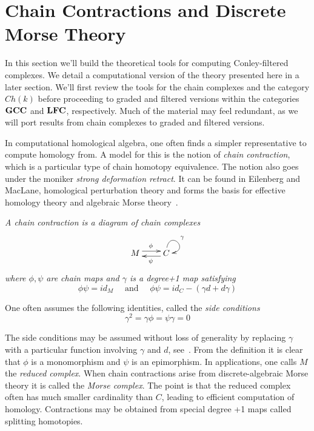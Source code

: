 

\section{Chain Contractions and Discrete Morse Theory}\label{sec:contractions}

In this section we'll build the theoretical tools for computing Conley-filtered complexes.   We detail a computational version of the theory presented here in a later section.  We'll first review the tools for the chain complexes and the category $Ch(k)$ before proceeding to graded and filtered versions within the categories ${\bf GCC}$ and ${\bf LFC}$, respectively.  Much of the material may feel redundant, as we will port results from chain complexes to graded and filtered versions.


  In computational homological algebra, one often finds a simpler representative to compute homology from.  A model for this is the notion of {\em chain contraction}, which is a particular type of chain homotopy equivalence.  The notion also goes under the moniker {\em strong deformation retract}.  It can be found in Eilenberg and MacLane, homological perturbation theory and forms the basis for effective homology theory and algebraic Morse theory~\cite{}.

\begin{defn}
{\em A {\em chain contraction} is a diagram of chain complexes
\[
\xymatrixrowsep{0.03in}
\xymatrixcolsep{0.3in}
\xymatrix{
M  \ar[r]<3pt>^{\phi} & \ar[l]<3pt>^{\psi} C \ar@(u,r)^{\gamma}
}
\]
where $\phi,\psi$ are chain maps and $\gamma$ is a degree+1 map satisfying 
\[
\phi\psi = id_M\quad\text{ and }\quad \phi\psi = id_C-(\gamma d+d\gamma)
\]
}
\end{defn}

One often assumes the following identities, called the {\em side conditions}
\[
\gamma^2 = \gamma\phi = \psi\gamma = 0
\]
 
The side conditions may be assumed without loss of generality by replacing $\gamma$ with a particular function involving $\gamma$ and $d$, see~\cite{gug}. From the definition it is clear that $\phi$ is a monomorphism and $\psi$ is an epimorphism.  In applications, one calls $M$ the {\em reduced complex}.  When chain contractions arise from discrete-algebraic Morse theory it is called the {\em Morse complex}.  The point is that the reduced complex often has much smaller cardinality than $C$, leading to efficient computation of homology.  Contractions may be obtained from special degree +1 maps called splitting homotopies.

